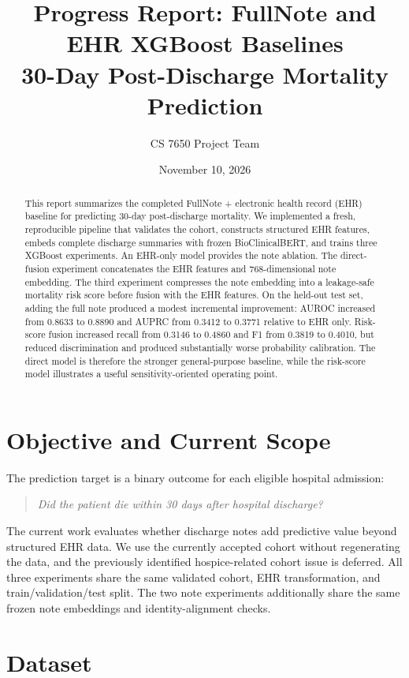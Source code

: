 \documentclass[11pt]{article}
\title{\textbf{Progress Report: FullNote and EHR XGBoost Baselines}\\
\large 30-Day Post-Discharge Mortality Prediction}
\author{CS 7650 Project Team}
\date{November 10, 2026}
\begin{document}
\maketitle

\begin{abstract}
This report summarizes the completed FullNote + electronic health record (EHR)
baseline for predicting 30-day post-discharge mortality. We implemented a fresh,
reproducible pipeline that validates the cohort, constructs structured EHR
features, embeds complete discharge summaries with frozen BioClinicalBERT, and
trains three XGBoost experiments. An EHR-only model provides the note ablation.
The direct-fusion experiment concatenates the EHR features and 768-dimensional
note embedding. The third experiment compresses the note
embedding into a leakage-safe mortality risk score before fusion with the EHR
features. On the held-out test set, adding the full note produced a modest
incremental improvement: AUROC increased from
0.8633 to 0.8890 and AUPRC from 0.3412 to 0.3771 relative to EHR only.
Risk-score fusion increased recall from 0.3146 to 0.4860 and
F1 from 0.3819 to 0.4010, but reduced discrimination and produced substantially
worse probability calibration. The direct model is therefore the stronger
general-purpose baseline, while the risk-score model illustrates a useful
sensitivity-oriented operating point.
\end{abstract}

\section{Objective and Current Scope}

The prediction target is a binary outcome for each eligible hospital admission:

\begin{quote}
\emph{Did the patient die within 30 days after hospital discharge?}
\end{quote}

The current work evaluates whether discharge notes add predictive value beyond
structured EHR data. We use the currently accepted cohort without regenerating
the data, and the previously identified hospice-related cohort issue is deferred.
All three experiments share the same validated cohort, EHR transformation, and
train/validation/test split. The two note experiments additionally share the
same frozen note embeddings and identity-alignment checks.

\section{Dataset}
\end{document}
